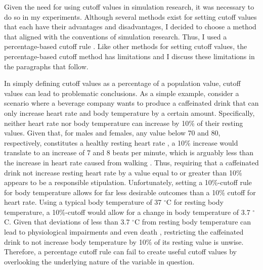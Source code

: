 \documentclass[
12pt, %
twoside,
english]{guelphthesis}
\begin{document}
Given the need for using cutoff values in simulation research, it was necessary to do so in my experiments. Although several methods exist for setting cutoff values that each have their advantages and disadvantages, I decided to choose a method that aligned with the conventions of simulation research. Thus, I used a percentage-based cutoff rule \autocite{muthen1997}. Like other methods for setting cutoff values, the percentage-based cutoff method has limitations and I discuss these limitations in the paragraphs that follow.

In simply defining cutoff values as a percentage of a population value, cutoff values can lead to problematic conclusions. As a simple example, consider a scenario where a beverage company wants to produce a caffeinated drink that can only increase heart rate and body temperature by a certain amount. Specifically, neither heart rate nor body temperature can increase by 10\% of their resting values. Given that, for males and females, any value below 70 and 80, respectively, constitutes a healthy resting heart rate \autocite{nanchen2018}, a 10\% increase would translate to an increase of 7 and 8 beats per minute, which is arguably less than the increase in heart rate caused from walking \autocite[e.g.,][]{whitley1987}. Thus, requiring that a caffeinated drink not increase resting heart rate by a value equal to or greater than 10\% appears to be a responsible stipulation. Unfortunately, setting a 10\%-cutoff rule for body temperature allows for far less desirable outcomes than a 10\% cutoff for heart rate. Using a typical body temperature of 37 \(^\circ\)C for resting body temperature, a 10\%-cutoff would allow for a change in body temperature of 3.7 \(^\circ\)C. Given that deviations of less than 3.7 \(^\circ\)C from resting body temperature can lead to physiological impairments and even death \autocite{moran2002}, restricting the caffeinated drink to not increase body temperature by 10\% of its resting value is unwise. Therefore, a percentage cutoff rule can fail to create useful cutoff values by overlooking the underlying nature of the variable in question.
\end{document}
